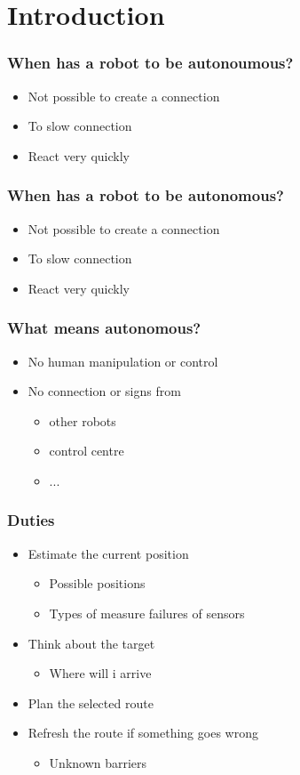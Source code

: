 \section{Introduction}


\frame
{
\frametitle{When has a robot to be autonoumous?}

\begin{itemize}
\item Not possible to create a connection
\item To slow connection
\item React very quickly
\end{itemize}
}


\frame
{
\frametitle{When has a robot to be autonomous?}

\begin{itemize}
\item Not possible to create a connection
\item To slow connection
\item React very quickly
\end{itemize}
}


\frame
{
\frametitle{What means autonomous?}

\begin{itemize}
\item No human manipulation or control
\item No connection or signs from
	\begin{itemize}
	\item other robots
	\item control centre
	\item ...
	\end{itemize}
\end{itemize}
}


\frame
{
\frametitle{Duties}

\begin{itemize}
\item Estimate the current position
	\begin{itemize}
	\item Possible positions
	\item Types of measure failures of sensors
	\end{itemize}
\item Think about the target
	\begin{itemize}
	\item Where will i arrive
	\end{itemize}
\item Plan the selected route
\item Refresh the route if something goes wrong
	\begin{itemize}
	\item Unknown barriers
	\end{itemize}
\end{itemize}
}


